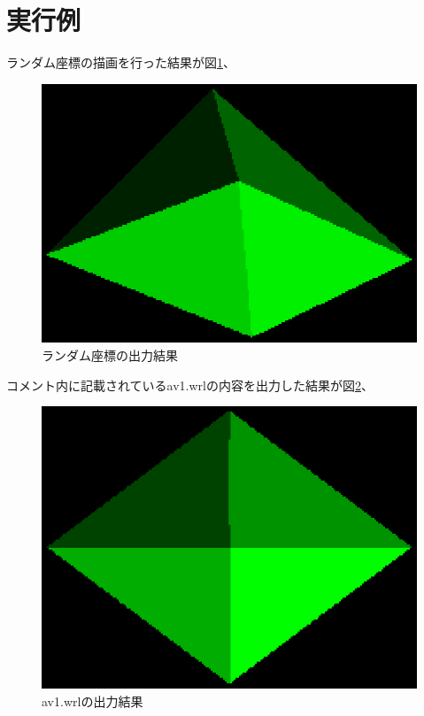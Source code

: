 \documentclass[a4j,dvipdfmx]{jsarticle}
\begin{document}
\section{実行例}
ランダム座標の描画を行った結果が図\ref{fig:random}、
\begin{figure}[htbp]
  \begin{center}
        \includegraphics[clip,scale=0.7]{images/random.eps}
        \caption{ランダム座標の出力結果}
        \label{fig:random}
  \end{center}
\end{figure}
コメント内に記載されているav1.wrlの内容を出力した結果が図\ref{fig:av1}、
\begin{figure}[htbp]
  \begin{center}
        \includegraphics[clip,scale=0.7]{images/av1.eps}
        \caption{av1.wrlの出力結果}
        \label{fig:av1}
  \end{center}
\end{figure}
\end{document}
